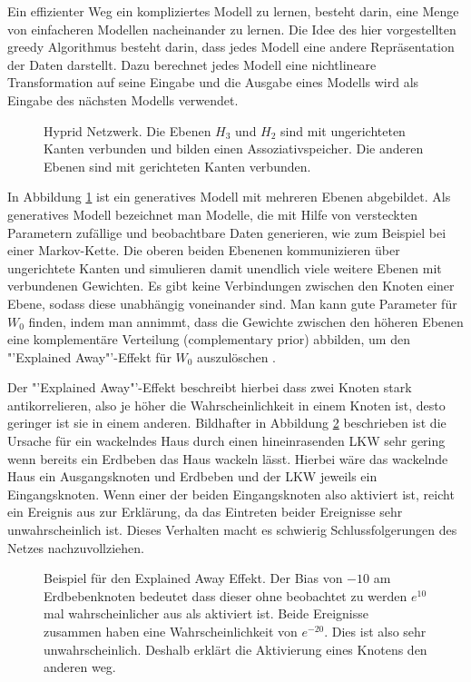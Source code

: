 \documentclass[12pt]{article}
\begin{document}
Ein effizienter Weg ein kompliziertes Modell zu lernen, besteht darin, eine Menge von einfacheren Modellen nacheinander zu lernen. Die Idee des hier vorgestellten greedy Algorithmus besteht darin, dass jedes Modell eine andere Repräsentation der Daten darstellt. Dazu berechnet jedes Modell eine nichtlineare Transformation auf seine Eingabe und die Ausgabe eines Modells wird als Eingabe des nächsten Modells verwendet. 

\begin{figure}[H]
	\center
	
	\caption{Hyprid Netzwerk. Die Ebenen $H_3$ und $H_2$ sind mit ungerichteten Kanten verbunden und bilden einen Assoziativspeicher. Die anderen Ebenen sind mit gerichteten Kanten verbunden.}
	\label{Netz}
\end{figure}

In Abbildung \ref{Netz} ist ein generatives Modell mit mehreren Ebenen abgebildet. Als generatives Modell bezeichnet man Modelle, die mit Hilfe von versteckten Parametern zufällige und  beobachtbare Daten generieren, wie zum Beispiel bei einer Markov-Kette. Die oberen beiden Ebenenen kommunizieren über ungerichtete Kanten und simulieren damit unendlich viele weitere Ebenen mit verbundenen Gewichten. Es gibt keine Verbindungen zwischen den Knoten einer Ebene, sodass diese unabhängig voneinander sind.  Man kann gute Parameter für $W_0$ finden, indem man annimmt, dass die  Gewichte zwischen den höheren Ebenen eine komplementäre Verteilung (complementary prior) abbilden, um den "'Explained Away"'-Effekt für $W_0$ auszulöschen \cite{learning}.

Der "'Explained Away"'-Effekt beschreibt hierbei dass zwei Knoten stark antikorrelieren, also je höher die Wahrscheinlichkeit in einem Knoten ist, desto geringer ist sie in einem anderen. 
Bildhafter in Abbildung \ref{ExplainedAway} beschrieben ist die Ursache für ein wackelndes Haus durch einen hineinrasenden LKW sehr gering wenn bereits ein Erdbeben das Haus wackeln lässt. Hierbei wäre das wackelnde Haus ein Ausgangsknoten und Erdbeben und der LKW jeweils ein Eingangsknoten. Wenn einer der beiden Eingangsknoten also aktiviert ist, reicht ein Ereignis aus zur Erklärung, da das Eintreten beider Ereignisse sehr unwahrscheinlich ist. Dieses Verhalten macht es schwierig Schlussfolgerungen des Netzes nachzuvollziehen. 

\begin{figure}[H]
	\center
	
	\caption{Beispiel für den Explained Away Effekt. Der Bias von $-10$ am Erdbebenknoten bedeutet dass dieser ohne beobachtet zu werden $e^10$ mal wahrscheinlicher aus als aktiviert ist. Beide Ereignisse zusammen haben eine Wahrscheinlichkeit von $e^{-20}$. Dies ist also sehr unwahrscheinlich. Deshalb erklärt die Aktivierung eines Knotens den anderen weg.}
	\label{ExplainedAway}
\end{figure}
\end{document}
